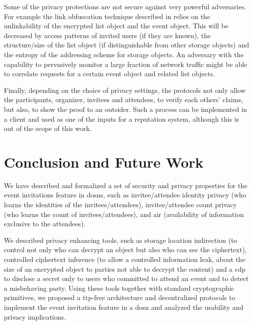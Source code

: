 Some of the privacy protections are not secure against very powerful 
adversaries. For example the link obfuscation technique described in
 relies on the
unlinkability of the encrypted list object and the event object. This
will be decreased by access patterns of invited users (if they are
known), the structure/size of the list object (if distinguishable from
other storage objects) and the entropy of the addressing scheme for
storage objects. An adversary with the capability to pervasively monitor
a large fraction of network traffic might be able to correlate requests
for a certain event object and related list objects.

Finally, depending on the choice of privacy settings, the protocols not only allow 
the participants, \ie organizer, invitees and attendees, to verify each others' 
claims, but also, to show the proof to an outsider. Such a process can be implemented in a client 
and used as one of the inputs for a reputation system, although this is out 
of the scope of this work.


\section{Conclusion and Future Work}
	\label{section:event-invitations-dosns:conclusion-and-future-work}
We have described and formalized a set of security and privacy properties for the 
event invitations feature in \Acp{dosn}, such as invitee/attendee identity privacy 
(who learns the identities of the invitees/attendees), invitee/attendee count privacy 
(who learns the count of invitees/attendees), and \acl{air} (availability of information 
exclusive to the attendees). 

We described privacy enhancing tools, such as storage location 
indirection (to control not only who can decrypt an object but also who can see 
the ciphertext), controlled ciphertext inference (to allow a controlled information leak, 
\eg about the size of an encrypted object to parties not able to decrypt the content) 
and a \acl{cdp} to disclose a secret only to users who committed to attend 
an event and to detect a misbehaving party. Using these tools together with standard cryptographic primitives, 
we proposed a \Ac{ttp}-free architecture and decentralized protocols to implement the event 
invitation feature in a \Ac{dosn} and analyzed the usability and privacy implications. 

